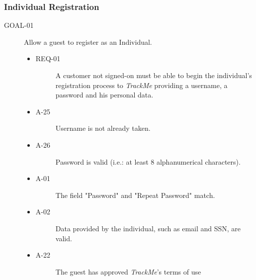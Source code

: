 \documentclass[a4paper]{article}
\newcommand{\requirement}{\ding{229}}%
\begin{document}
        \subsubsection{Individual Registration}
		\begin{description}
        	\item[GOAL-01] Allow a guest to register as an Individual.
                    \begin{itemize}
            	    \item[\requirement]
                	\begin{description}
                	\item[REQ-01] A customer not signed-on must be able to begin the individual's registration process to \textit{TrackMe} providing a username, a password and his personal data.
                	\end{description}
                	\item
                	\begin{description}
                	\item[A-25] Username is not already taken.
                	\end{description}
                	\item
                	\begin{description}
                	\item[A-26] Password is valid (i.e.: at least 8 alphanumerical characters).
                	\end{description}
                	\item
                	\begin{description}
                	\item[A-01] The field "Password" and "Repeat Password" match.
                	\end{description}
                	\item
                	\begin{description}
                	\item[A-02] Data provided by the individual, such as email and SSN, are valid.
                	\end{description}
                	\item
                	\begin{description}
                	\item[A-22] The guest has approved \textit{TrackMe}'s terms of use
                	\end{description}
                	\end{itemize}
        \end{description} 
        
\end{document}
